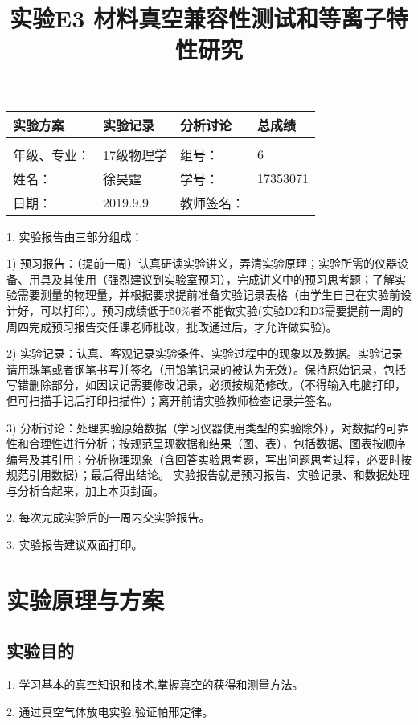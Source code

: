\documentclass{ctexart}
\title{实验E3 材料真空兼容性测试和等离子特性研究}
\begin{document}
\maketitle

\begin{tabular}{|p{8em}|p{8em}|p{8em}|p{5em}|}
\hline
		\large{实验方案} &\large{实验记录}  &\large{分析讨论} &\large{总成绩}\\
		\hline
		        &          &          &  \\
	    \hline
	\hline 
	年级、专业： &17级物理学 &组号：& 6 \\
	\hline
	姓名：& 徐昊霆 &学号：&17353071  \\
	\hline
	日期：& 2019.9.9 &教师签名： &  \\
    \hline	
        \end{tabular}
        
        1. 实验报告由三部分组成：
        
        1) 预习报告：（提前一周）认真研读实验讲义，弄清实验原理；实验所需的仪器设备、用具及其使用（强烈建议到实验室预习），完成讲义中的预习思考题；了解实验需要测量的物理量，并根据要求提前准备实验记录表格（由学生自己在实验前设计好，可以打印）。预习成绩低于50\%者不能做实验(实验D2和D3需要提前一周的周四完成预习报告交任课老师批改，批改通过后，才允许做实验)。
        
        2) 实验记录：认真、客观记录实验条件、实验过程中的现象以及数据。实验记录请用珠笔或者钢笔书写并签名（用铅笔记录的被认为无效）。保持原始记录，包括写错删除部分，如因误记需要修改记录，必须按规范修改。（不得输入电脑打印，但可扫描手记后打印扫描件）；离开前请实验教师检查记录并签名。
        
    3) 分析讨论：处理实验原始数据（学习仪器使用类型的实验除外），对数据的可靠性和合理性进行分析；按规范呈现数据和结果（图、表），包括数据、图表按顺序编号及其引用；分析物理现象（含回答实验思考题，写出问题思考过程，必要时按规范引用数据）；最后得出结论。
    实验报告就是预习报告、实验记录、和数据处理与分析合起来，加上本页封面。
    
    2. 每次完成实验后的一周内交实验报告。
    
    3. 实验报告建议双面打印。
\newpage
\tableofcontents
\newpage
\section{实验原理与方案}
\subsection{实验目的}
\par 
1. 学习基本的真空知识和技术,掌握真空的获得和测量方法。
\par
2. 通过真空气体放电实验,验证帕邢定律。
\end{document}
